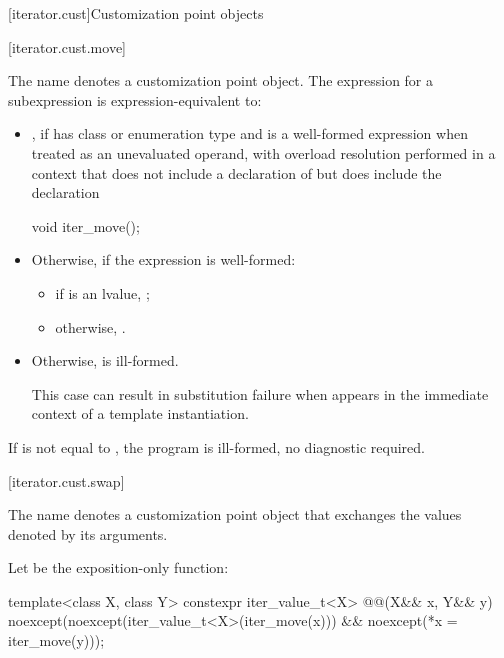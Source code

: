 [iterator.cust]{Customization point objects}

[iterator.cust.move]{}

%
\pnum
The name  denotes
a customization point object.
The expression  for a subexpression  is
expression-equivalent to:
\begin{itemize}
\item {}, if
 has class or enumeration type and
 is a well-formed expression when treated as an unevaluated operand,
with overload resolution performed in a context
that does not include a declaration of 
but does include the declaration
\begin{codeblock}
void iter_move();
\end{codeblock}

\item Otherwise, if the expression  is well-formed:
\begin{itemize}
\item if  is an lvalue, ;

\item otherwise, .
\end{itemize}

\item Otherwise,  is ill-formed.
\begin{note}
This case can result in substitution failure when 
appears in the immediate context of a template instantiation.
\end{note}
\end{itemize}

\pnum
If  is not equal to ,
the program is ill-formed, no diagnostic required.

[iterator.cust.swap]{}

%
\pnum
The name  denotes
a customization point object
that exchanges the values denoted by its
arguments.

\pnum
Let  be the exposition-only function:
\begin{itemdecl}
template<class X, class Y>
  constexpr iter_value_t<X> @@(X&& x, Y&& y)
    noexcept(noexcept(iter_value_t<X>(iter_move(x))) &&
             noexcept(*x = iter_move(y)));
\end{itemdecl}

